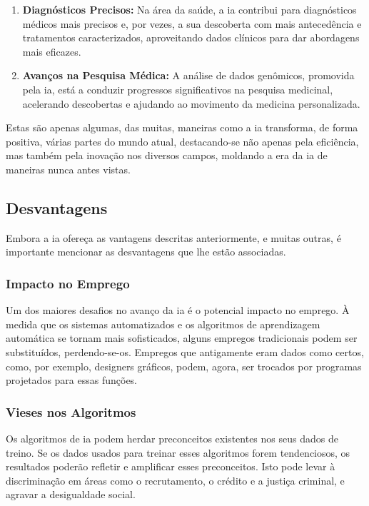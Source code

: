 \documentclass{report}
\begin{document}
\begin{enumerate}
	\item \textbf{Diagnósticos Precisos:} Na área da saúde, a \ac{ia} contribui para diagnósticos médicos mais precisos e, por vezes, a sua descoberta com mais antecedência e tratamentos caracterizados, aproveitando dados clínicos para dar abordagens mais eficazes.

	\item \textbf{Avanços na Pesquisa Médica:} A análise de dados genômicos, promovida pela \ac{ia}, está a conduzir progressos significativos na pesquisa medicinal, acelerando descobertas e ajudando ao movimento da medicina personalizada.
\end{enumerate}

	Estas são apenas algumas, das muitas, maneiras como a \ac{ia} transforma, de forma positiva, várias partes do mundo atual, destacando-se não apenas pela eficiência, mas também pela inovação nos diversos campos, moldando a era da \ac{ia} de maneiras nunca antes vistas.

\subsection{Desvantagens}
\label{subsec.desvantagens}

	Embora a \ac{ia} ofereça as vantagens descritas anteriormente, e muitas outras, é importante mencionar as desvantagens que lhe estão associadas.

\subsubsection{Impacto no Emprego}
\label{subsubsec.emprego}

	Um dos maiores desafios no avanço da \ac{ia} é o potencial impacto no emprego. À medida que os sistemas automatizados e os algoritmos de aprendizagem automática se tornam mais sofisticados, alguns empregos tradicionais podem ser substituídos, perdendo-se-os. Empregos que antigamente eram dados como certos, como, por exemplo, designers gráficos, podem, agora, ser trocados por programas projetados para essas funções.

\subsubsection{Vieses nos Algoritmos}
\label{subsubsec.algoritmos}
	
	Os algoritmos de \ac{ia} podem herdar preconceitos existentes nos seus dados de treino. Se os dados usados para treinar esses algoritmos forem tendenciosos, os resultados poderão refletir e amplificar esses preconceitos. Isto pode levar à discriminação em áreas como o recrutamento, o crédito e a justiça criminal, e agravar a desigualdade social. \cite{vieses} \cite{vieses2}
\end{document}
